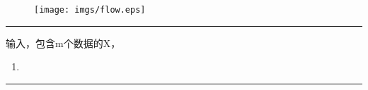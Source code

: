\documentclass[11pt]{ctexart}         %
\begin{document}
	\setlength{\belowdisplayskip}{6pt}%
	\setlength{\abovedisplayskip}{6pt}%
	\setlength{\belowdisplayshortskip}{0pt}%
	\setlength{\abovedisplayshortskip}{0pt}%
	
	\begin{figure}[h]
		\centering
		\texttt{[image: imgs/flow.eps]}
	\end{figure}
	\hrule height 4pt
	输入，包含m个数据的X，
	\begin{enumerate}[itemsep=0pt,parsep=0pt,topsep=0pt]
		\item
	\end{enumerate}
	\hrule height 4pt
\end{document}
